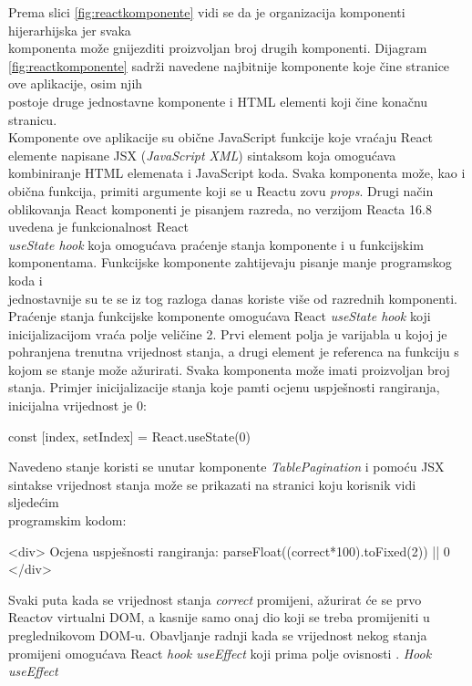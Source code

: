 \documentclass[times, utf8, zavrsni]{fer}
\begin{document}
            \FloatBarrier
Prema slici \ref{fig:reactkomponente} vidi se da je organizacija komponenti hijerarhijska jer svaka \\komponenta može gnijezditi proizvoljan broj drugih komponenti.
Dijagram \ref{fig:reactkomponente} sadrži navedene najbitnije komponente koje čine stranice ove aplikacije, osim njih \\postoje druge jednostavne komponente i HTML elementi 
koji čine konačnu stranicu. \\Komponente ove aplikacije su obične JavaScript funkcije koje vraćaju React elemente napisane JSX (\emph{JavaScript XML}) sintaksom koja 
omogućava kombiniranje HTML elemenata i JavaScript koda. Svaka komponenta može, kao i obična funkcija, primiti argumente koji se u Reactu zovu \emph{props}.
Drugi način oblikovanja React komponenti je pisanjem razreda, no verzijom Reacta 16.8 uvedena je funkcionalnost React \\\emph{useState hook} koja omogućava 
praćenje stanja komponente i u funkcijskim komponentama. Funkcijske komponente zahtijevaju pisanje manje programskog koda i \\jednostavnije su te se iz tog
razloga danas koriste više od razrednih komponenti. 
Praćenje stanja funkcijske komponente omogućava React \emph{useState hook} koji \\inicijalizacijom vraća polje veličine 2. Prvi element polja je varijabla u kojoj 
je pohranjena trenutna vrijednost stanja, a drugi element je referenca na funkciju s kojom se stanje može ažurirati. Svaka komponenta može imati 
proizvoljan broj stanja. Primjer inicijalizacije stanja koje pamti ocjenu uspješnosti rangiranja, inicijalna vrijednost je 0:
\begin{verbnobox}[\fontsize{10pt}{10pt}\selectfont]
const [index, setIndex] = React.useState(0)
\end{verbnobox}
Navedeno stanje koristi se unutar komponente \emph{TablePagination} i pomoću JSX sintakse vrijednost stanja može se prikazati na stranici koju korisnik vidi sljedećim \\programskim kodom:
\begin{verbnobox}[\fontsize{10pt}{10pt}\selectfont]
<div>
    Ocjena uspješnosti rangiranja: 
        {parseFloat((correct*100).toFixed(2)) || 0}
</div>
\end{verbnobox}
Svaki puta kada se vrijednost stanja \emph{correct} promijeni, ažurirat će se prvo Reactov virtualni DOM, a kasnije samo onaj dio koji se treba promijeniti u preglednikovom DOM-u.
Obavljanje radnji kada se vrijednost nekog stanja promijeni omogućava React \emph{hook useEffect} koji prima polje ovisnosti . \emph{Hook useEffect}
\end{document}
